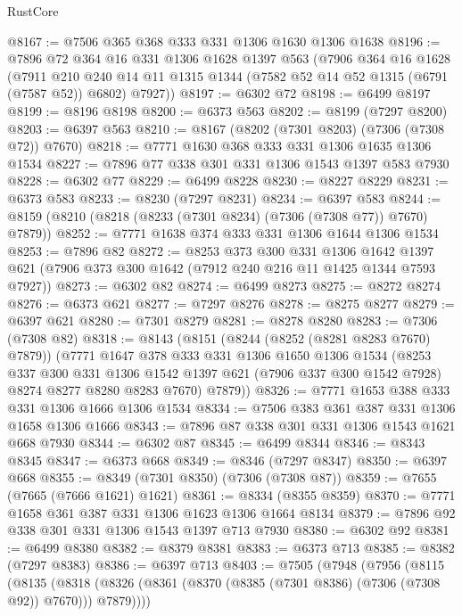 \begin{lexlean}{RustCore}
\begin{coremodule}
@8167 := @7506 @365 @368 @333 @331 @1306 @1630 @1306 @1638
@8196 := @7896
    @72
    @364
    @16
    @331
    @1306
    @1628
    @1397
    @563
    (@7906
      @364
      @16
      @1628
      (@7911
        @210
        @240
        @14
        @11
        @1315
        @1344
        (@7582 @52 @14 @52 @1315 (@6791 (@7587 @52)) @6802)
        @7927))
@8197 := @6302 @72
@8198 := @6499 @8197
@8199 := @8196 @8198
@8200 := @6373 @563
@8202 := @8199 (@7297 @8200)
@8203 := @6397 @563
@8210 := @8167 (@8202 (@7301 @8203) (@7306 (@7308 @72)) @7670)
@8218 := @7771 @1630 @368 @333 @331 @1306 @1635 @1306 @1534
@8227 := @7896 @77 @338 @301 @331 @1306 @1543 @1397 @583 @7930
@8228 := @6302 @77
@8229 := @6499 @8228
@8230 := @8227 @8229
@8231 := @6373 @583
@8233 := @8230 (@7297 @8231)
@8234 := @6397 @583
@8244 := @8159 (@8210 (@8218 (@8233 (@7301 @8234) (@7306 (@7308 @77)) @7670) @7879))
@8252 := @7771 @1638 @374 @333 @331 @1306 @1644 @1306 @1534
@8253 := @7896 @82
@8272 := @8253
    @373
    @300
    @331
    @1306
    @1642
    @1397
    @621
    (@7906 @373 @300 @1642 (@7912 @240 @216 @11 @1425 @1344 @7593 @7927))
@8273 := @6302 @82
@8274 := @6499 @8273
@8275 := @8272 @8274
@8276 := @6373 @621
@8277 := @7297 @8276
@8278 := @8275 @8277
@8279 := @6397 @621
@8280 := @7301 @8279
@8281 := @8278 @8280
@8283 := @7306 (@7308 @82)
@8318 := @8143
    (@8151
      (@8244 (@8252 (@8281 @8283 @7670) @7879))
      (@7771
        @1647
        @378
        @333
        @331
        @1306
        @1650
        @1306
        @1534
        (@8253
          @337
          @300
          @331
          @1306
          @1542
          @1397
          @621
          (@7906 @337 @300 @1542 @7928)
          @8274
          @8277
          @8280
          @8283
          @7670)
        @7879))
@8326 := @7771 @1653 @388 @333 @331 @1306 @1666 @1306 @1534
@8334 := @7506 @383 @361 @387 @331 @1306 @1658 @1306 @1666
@8343 := @7896 @87 @338 @301 @331 @1306 @1543 @1621 @668 @7930
@8344 := @6302 @87
@8345 := @6499 @8344
@8346 := @8343 @8345
@8347 := @6373 @668
@8349 := @8346 (@7297 @8347)
@8350 := @6397 @668
@8355 := @8349 (@7301 @8350) (@7306 (@7308 @87))
@8359 := @7655 (@7665 (@7666 @1621) @1621)
@8361 := @8334 (@8355 @8359)
@8370 := @7771 @1658 @361 @387 @331 @1306 @1623 @1306 @1664 @8134
@8379 := @7896 @92 @338 @301 @331 @1306 @1543 @1397 @713 @7930
@8380 := @6302 @92
@8381 := @6499 @8380
@8382 := @8379 @8381
@8383 := @6373 @713
@8385 := @8382 (@7297 @8383)
@8386 := @6397 @713
@8403 := @7505
    (@7948
      (@7956
        (@8115
          (@8135
            (@8318 (@8326 (@8361 (@8370 (@8385 (@7301 @8386) (@7306 (@7308 @92)) @7670))) @7879))))

\end{coremodule}
\end{lexlean}
